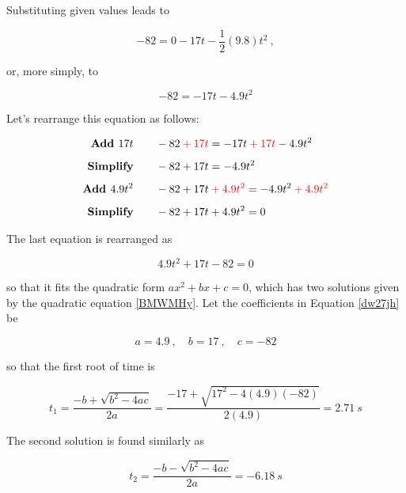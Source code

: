 \documentclass{article}
\begin{document}
\vspace{1em}

Substituting given values leads to 

\begin{equation*}
    -82 =  0 - 17 t -\frac{1}{2}(9.8) t^2\ ,
\end{equation*}

or, more simply, to

\begin{equation*}
     -82 = - 17 t -4.9 t^2
\end{equation*}

Let's rearrange this equation as follows:

\begin{align*}
    \textbf{Add $17t$} \qquad & - 82 \mathbin{\color{red} +} \textcolor{red}{17t} = -17t \mathbin{\color{red} +} \textcolor{red}{17t} - 4.9 t^2 \\[1ex]
    \textbf{Simplify} \qquad & -82 + 17t = -4.9t^2\\[1ex]
    \textbf{Add $4.9 t^2$} \qquad & -82 + 17t \mathbin{\color{red} +} \textcolor{red}{4.9 t^2} = -4.9t^2 \mathbin{\color{red} +} \textcolor{red}{4.9 t^2}\\[1ex]
    \textbf{Simplify} \qquad & -82 + 17t + 4.9t^2 = 0
\end{align*}

The last equation is rearranged as 

\begin{equation} \label{dw27jh}
    4.9 t^2 + 17t - 82 = 0
\end{equation}

so that it fits the quadratic form $ax^2 + bx + c = 0$, which has two solutions given by the quadratic equation \eqref{BMWMHy}. Let the coefficients in Equation \eqref{dw27jh} be

\begin{equation*}
    a = 4.9\ , \quad b = 17\ ,\quad c = -82
\end{equation*}

so that the first root of time is

\begin{equation*}
    t_1 = \frac{-b + \sqrt{b^2 - 4ac}}{2a} = \frac{-17 + \sqrt{17^2 - 4(4.9)(-82)}}{2(4.9)} = \SI{2.71}{s}
\end{equation*}

The second solution is found similarly as

\begin{equation*}
    t_2 = \frac{-b - \sqrt{b^2 - 4ac}}{2a} = \SI{-6.18}{s}
\end{equation*}
\end{document}
